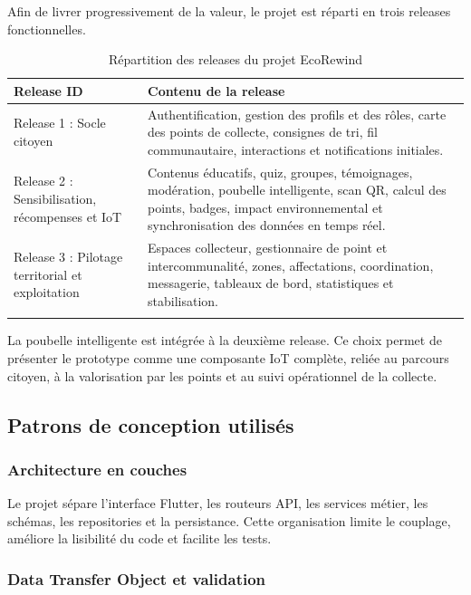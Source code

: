 Afin de livrer progressivement de la valeur, le projet est réparti en trois releases fonctionnelles.

\begin{longtable}{|p{2.5cm}|p{11cm}|}
\hline
\rowcolor{gray!35}
\textbf{Release ID} & \textbf{Contenu de la release} \\
\hline
Release 1 : Socle citoyen & Authentification, gestion des profils et des rôles, carte des points de collecte, consignes de tri, fil communautaire, interactions et notifications initiales. \\
\hline
Release 2 : Sensibilisation, récompenses et IoT & Contenus éducatifs, quiz, groupes, témoignages, modération, poubelle intelligente, scan QR, calcul des points, badges, impact environnemental et synchronisation des données en temps réel. \\
\hline
Release 3 : Pilotage territorial et exploitation & Espaces collecteur, gestionnaire de point et intercommunalité, zones, affectations, coordination, messagerie, tableaux de bord, statistiques et stabilisation. \\
\hline
\caption{Répartition des releases du projet EcoRewind}
\label{tab:repartition_releases}
\end{longtable}

La poubelle intelligente est intégrée à la deuxième release. Ce choix permet de présenter le prototype comme une composante IoT complète, reliée au parcours citoyen, à la valorisation par les points et au suivi opérationnel de la collecte.

\subsection{Patrons de conception utilisés}
\label{subsec:patrons_conception}

\subsubsection{Architecture en couches}

Le projet sépare l'interface Flutter, les routeurs API, les services métier, les schémas, les repositories et la persistance. Cette organisation limite le couplage, améliore la lisibilité du code et facilite les tests.

\subsubsection{Data Transfer Object et validation}

